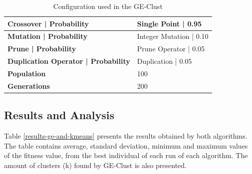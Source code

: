 \documentclass[conference,compsoc]{IEEEtran}
\begin{document}
\begin{table}[]
	\centering
	\caption{Configuration used in the GE-Clust}
	\label{ge-configuration}
	\begin{tabular}{|l|l|}
		\hline
		\textbf{Crossover  |  Probability}         & Single Point  | 0.95     \\ \hline
		\textbf{Mutation | Probability}            & Integer Mutation          |  0.10 \\ \hline
		\textbf{Prune  | Probability}      & Prune Operator           | 0.05   \\ \hline
		\textbf{Duplication Operator | Probability} & Duplication   | 0.05     \\ \hline
		\textbf{Population}                        & 100                               \\ \hline
		\textbf{Generations}                       & 200                               \\ \hline
	\end{tabular}
\end{table}


\subsection{Results and Analysis}



Table \ref{results-ge-and-kmeans} presents the results obtained by both algorithms. The table contains average, 
standard deviation, minimum and maximum values of the fitness value,  from the best individual of each run of each algorithm. The amount of clusters (k) found by GE-Clust is also presented.
\end{document}
